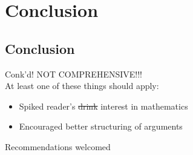 \documentclass{beamer}
\begin{document}
	\section{Conclusion}
		\subsection{Conclusion}
			\begin{frame}{Conk'd!}
				NOT COMPREHENSIVE!!!\\
				At least one of these things should apply:
				\begin{itemize}
					\item Spiked reader's \st{drink} interest in mathematics
					\item Encouraged better structuring of arguments
				\end{itemize}
				Recommendations welcomed
			\end{frame}
\end{document}
